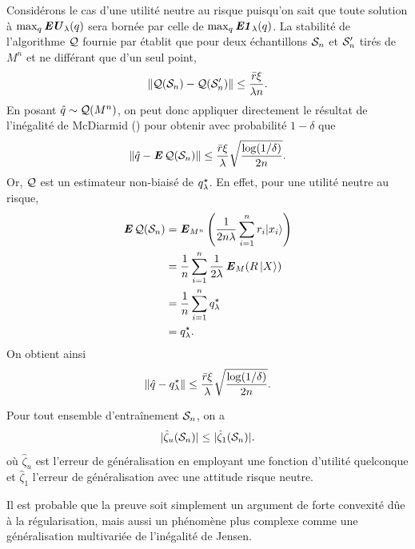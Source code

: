 \begin{conj}
  \label{b:lem:qhnorm}
  Considérons le cas d'une utilité neutre au risque puisqu'on sait que toute solution à
  $\max_q\EU_\lambda(q)$ sera bornée par celle de $\max_q\EN_\lambda(q)$.  La stabilité de
  l'algorithme $\alg$ fournie par \cite{bousquet2002stability} établit que pour deux
  échantillons $\S_n$ et $\S_n'$ tirés de $M^n$ et ne différant que d'un seul point,
  \begin{equation}
    \|\alg(\S_n) - \alg(\S'_n)\| \leq \frac{\rmax\xi}{\lambda n}.
  \end{equation}
  En posant $\qh \sim \alg(M^n)$, on peut donc appliquer directement le résultat de
  l'inégalité de McDiarmid () pour obtenir avec probabilité
  $1-\delta$ que
  \begin{equation}
    \|\qh - \E\alg(\S_n)\| \leq \frac{\rmax\xi}{\lambda}\sqrt{\frac{\log(1/\delta)}{2n}}.
  \end{equation}
  Or, $\alg$ est un estimateur non-biaisé de $\qsl$. En effet, pour une utilité neutre au
  risque,
  \begin{align}
    \E\alg(\S_n) &= \E_{M^n}\left(\frac{1}{2n\lambda}\sumi r_i|x_i\rangle\right)\\
                 & =\frac{1}{n}\sumi \frac{1}{2\lambda}\E_M(R\,|X\rangle)\\
                 & =\frac{1}{n}\sumi \qsl\\
                 &=\qsl.
  \end{align}
  On obtient ainsi
  \begin{equation}
    \|\qh - \qsl\| \leq \frac{\rmax\xi}{\lambda}\sqrt{\frac{\log(1/\delta)}{2n}}.
  \end{equation}
\end{conj}

\begin{conj}
  Pour tout ensemble d'entraînement $\S_n$, on a
\begin{equation}
  |\hat\zeta_u(\S_n)| \leq |\hat\zeta_1(\S_n)|.
\end{equation}
où $\hat\zeta_u$ est l'erreur de généralisation en employant une fonction d'utilité quelconque
et $\hat\zeta_1$ l'erreur de généralisation avec une attitude risque neutre.
\end{conj}

\begin{rem}
  Il est probable que la preuve soit simplement un argument de forte convexité dûe à la
  régularisation, mais aussi un phénomène plus complexe comme une généralisation
  multivariée de l'inégalité de Jensen.
\end{rem}

